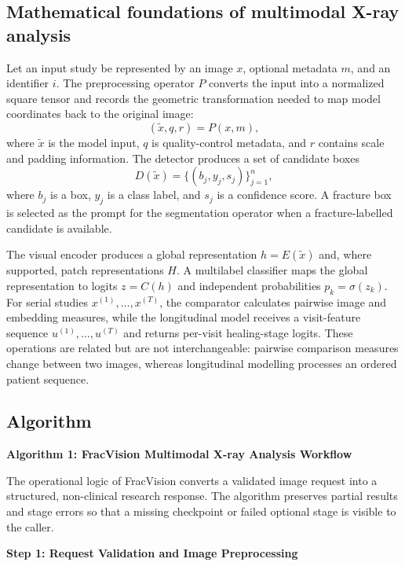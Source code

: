 \documentclass[12pt,a4paper]{article}
\begin{document}
\subsection{Mathematical foundations of multimodal X-ray analysis}
Let an input study be represented by an image $x$, optional metadata $m$, and an identifier $i$. The preprocessing operator $P$ converts the input into a normalized square tensor and records the geometric transformation needed to map model coordinates back to the original image:
\[
  (\tilde{x},q,r)=P(x,m),
\]
where $\tilde{x}$ is the model input, $q$ is quality-control metadata, and $r$ contains scale and padding information. The detector produces a set of candidate boxes
\[
  D(\tilde{x})=\{(b_j,y_j,s_j)\}_{j=1}^{n},
\]
where $b_j$ is a box, $y_j$ is a class label, and $s_j$ is a confidence score. A fracture box is selected as the prompt for the segmentation operator when a fracture-labelled candidate is available.

The visual encoder produces a global representation $h=E(\tilde{x})$ and, where supported, patch representations $H$. A multilabel classifier maps the global representation to logits $z=C(h)$ and independent probabilities $p_k=\sigma(z_k)$. For serial studies $x^{(1)},\ldots,x^{(T)}$, the comparator calculates pairwise image and embedding measures, while the longitudinal model receives a visit-feature sequence $u^{(1)},\ldots,u^{(T)}$ and returns per-visit healing-stage logits. These operations are related but are not interchangeable: pairwise comparison measures change between two images, whereas longitudinal modelling processes an ordered patient sequence.

\clearpage
\subsection{Algorithm}
\textbf{Algorithm 1: FracVision Multimodal X-ray Analysis Workflow}

The operational logic of FracVision converts a validated image request into a structured, non-clinical research response. The algorithm preserves partial results and stage errors so that a missing checkpoint or failed optional stage is visible to the caller.

\textbf{Step 1: Request Validation and Image Preprocessing}
\end{document}
